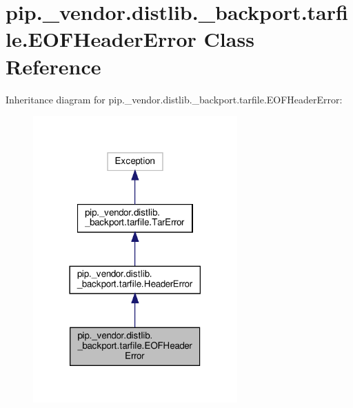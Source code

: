\hypertarget{classpip_1_1__vendor_1_1distlib_1_1__backport_1_1tarfile_1_1EOFHeaderError}{}\section{pip.\+\_\+vendor.\+distlib.\+\_\+backport.\+tarfile.\+E\+O\+F\+Header\+Error Class Reference}
\label{classpip_1_1__vendor_1_1distlib_1_1__backport_1_1tarfile_1_1EOFHeaderError}


Inheritance diagram for pip.\+\_\+vendor.\+distlib.\+\_\+backport.\+tarfile.\+E\+O\+F\+Header\+Error\+:
\nopagebreak
\begin{figure}[H]
\begin{center}
\leavevmode
\includegraphics[width=222pt]{classpip_1_1__vendor_1_1distlib_1_1__backport_1_1tarfile_1_1EOFHeaderError__inherit__graph}
\end{center}
\end{figure}


